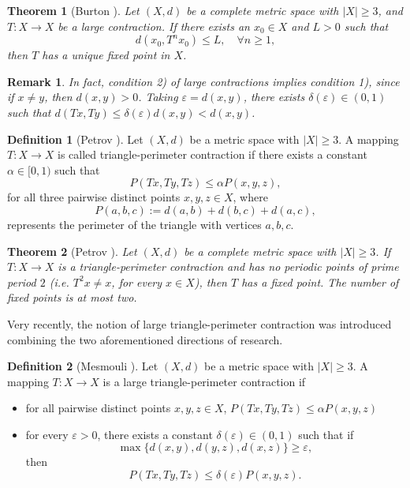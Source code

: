 \documentclass[12 pt]{article}
\theoremstyle{lema}
\theoremstyle{proposition}
\theoremstyle{theorem}
\newtheorem{theorem}{Theorem}[section]
\theoremstyle{theorem}
\newtheorem{remark}{Remark}[section]
\theoremstyle{corollary}
\theoremstyle{definition}
\newtheorem{definition}{Definition}[section]
\theoremstyle{example}
\begin{document}
	\begin{theorem}[Burton \cite{Burton2}]
		Let $(X,d)$ be a complete metric space with \(|X| \geq 3\), and $T:X\to X$ be a large contraction. If there exists an $x_0 \in X$ and $L > 0$ such that 
		\[ d(x_0,T^nx_0) \leq L, \quad \forall n \geq 1,\]
		 then $T$ has a unique fixed point in \(X\).
	\end{theorem} 

	\begin{remark}
		In fact, condition 2) of large contractions implies condition 1), since if \(x\neq y\), then \(d(x,y) > 0\). Taking \(\varepsilon = d(x,y)\), there exists \(\delta(\varepsilon) \in (0,1)\) such that \(d(Tx,Ty) \leq \delta(\varepsilon) d(x,y) < d(x,y)\).
	\end{remark}

	\begin{definition}[Petrov \cite{Petrov}]
		Let $(X,d)$ be a metric space with  $|X|\geq 3$. A mapping $T \colon X\to X$ is called triangle-perimeter contraction if there exists a constant $\alpha \in [0,1)$ such that 
		\[P(Tx,Ty,Tz) \leq \alpha P(x,y,z),\]
		 for all three pairwise distinct points $x,y,z \in X$, where
		$$P(a,b,c) := d(a,b)+d(b,c)+d(a,c),$$
		represents the perimeter of the triangle with vertices \(a,b,c\).
	\end{definition}
	

	\begin{theorem}[Petrov \cite{Petrov}]
		Let $(X,d)$ be a complete metric space with  $|X|\geq 3$. If $T \colon X\to X$ is a triangle-perimeter contraction and has no periodic points of prime period $2$ (i.e. \(T^2x\neq x\), for every \(x \in X\)), then $T$ has a fixed point. The number of fixed points is at most two.
	\end{theorem}

	Very recently, the notion of large triangle-perimeter contraction was introduced combining the two aforementioned directions of research.

	\begin{definition}[Mesmouli \cite{Mesmouli}]
		Let $(X,d)$ be a metric space with  $|X|\geq 3$. A mapping $T \colon X\to X$ is a large triangle-perimeter contraction if 
		\begin{itemize}
			\item[(i)] for all pairwise distinct points $x,y,z \in X$, \(P(Tx,Ty,Tz) \leq \alpha P(x,y,z)\)
			\item[(ii)] for every \(\varepsilon > 0\), there exists a constant \(\delta(\varepsilon) \in (0,1)\) such that if
			\[\max\{d(x,y), d(y,z), d(x,z)\} \geq \varepsilon, \]
			then 
			\[P(Tx,Ty,Tz) \leq \delta(\varepsilon)  P(x,y,z). \]
		\end{itemize} 
	\label{largeP}
	\end{definition}
\end{document}
